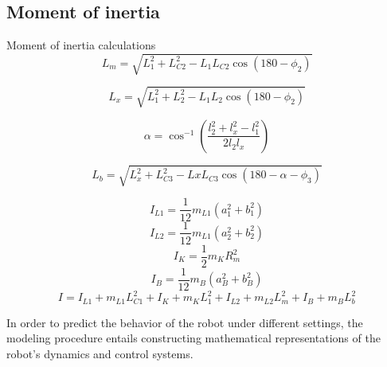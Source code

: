 	\subsection{Moment of inertia}
	Moment of inertia calculations
	\begin{equation}
		L_m = \sqrt{L_1^2 + L_{C2}^2 - L_1 L_{C2} \cos(180 - \phi_2)}
	\end{equation}

	\begin{equation}
		L_{x} = \sqrt{L_1^2 + L_2^2 - L_1 L_2 \cos(180 - \phi_2)}
	\end{equation}


	\begin{equation}
		\alpha = \cos^{-1} \left( \frac{l_2^2 + l_{x}^2 - l_1^2}{2 l_2 l_{x}} \right)
	\end{equation}


	\begin{equation}
		L_b = \sqrt{L_{x}^2 + L_{C3}^2 - Lx L_{C3} \cos(180 - \alpha - \phi_3 )}
	\end{equation}

	\begin{equation}
		I_{L1} = \frac{1}{12} m_{L1} (a_1^2 + b_1^2)
	\end{equation}
	\begin{equation}
		I_{L2} = \frac{1}{12} m_{L1} (a_2^2 + b_2^2)
	\end{equation}
	\begin{equation}
		I_K = \frac{1}{2} m_K R_m^2
	\end{equation}
	\begin{equation}
		I_B = \frac{1}{12} m_B (a_B^2 + b_B^2)
	\end{equation}
	\begin{equation}
		I = I_{L1} + m_{L1} L_{C1}^2 + I_K + m_K L_1^2 + I_{L2} + m_{L2} L_m^2 + I_B + m_B L_b^2
	\end{equation}


	In order to predict the behavior of the robot under different settings, the modeling procedure entails constructing mathematical representations of the robot's dynamics and control systems.






